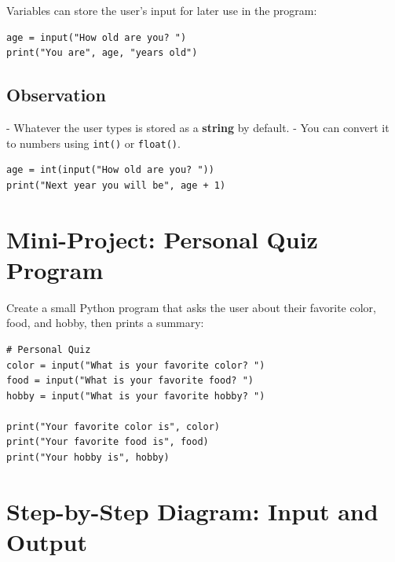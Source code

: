 Variables can store the user’s input for later use in the program:

\begin{verbatim}
age = input("How old are you? ")
print("You are", age, "years old")
\end{verbatim}

\subsection{Observation}

- Whatever the user types is stored as a \textbf{string} by default.  
- You can convert it to numbers using \texttt{int()} or \texttt{float()}.

\begin{verbatim}
age = int(input("How old are you? "))
print("Next year you will be", age + 1)
\end{verbatim}

\section{Mini-Project: Personal Quiz Program}

Create a small Python program that asks the user about their favorite color, food, and hobby, then prints a summary:

\begin{verbatim}
# Personal Quiz
color = input("What is your favorite color? ")
food = input("What is your favorite food? ")
hobby = input("What is your favorite hobby? ")

print("Your favorite color is", color)
print("Your favorite food is", food)
print("Your hobby is", hobby)
\end{verbatim}

\section{Step-by-Step Diagram: Input and Output}

\begin{center}
\end{center}

